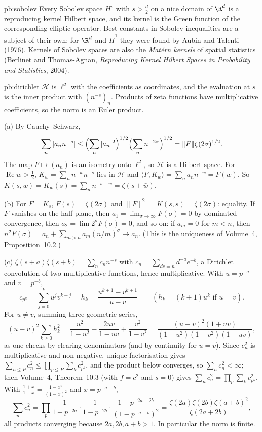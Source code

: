 \begin{solution}{pb:sobolev}
\leads Every Sobolev space $H^s$ with $s>\frac d2$ on a nice domain of $\R^d$ is a reproducing kernel Hilbert space, and its kernel is the Green function of the corresponding elliptic
operator. Best constants in Sobolev inequalities are a subject of their own; for $\R^d$ and $\dot H^1$ they were found by Aubin and Talenti (1976). Kernels of Sobolev spaces are also the
\emph{Matérn kernels} of spatial statistics (Berlinet and Thomas-Agnan, \emph{Reproducing Kernel Hilbert Spaces in Probability and Statistics}, 2004).
\end{solution}

\begin{solution}{pb:dirichlet}
\idea $\mathcal H$ is $\ell^2$ with the coefficients as coordinates, and the evaluation at $s$ is the inner product with $(n^{-\bar s})_n$. Products of zeta functions have
multiplicative coefficients, so the norm is an Euler product.

\writeup (a) By Cauchy--Schwarz,
\[
\sum_n|a_nn^{-s}|\le\Bigl(\sum_n|a_n|^2\Bigr)^{1/2}\Bigl(\sum_nn^{-2\sigma}\Bigr)^{1/2}=\|F\|\zeta(2\sigma)^{1/2}.
\] The map $F\mapsto(a_n)$ is an isometry onto
$\ell^2$, so $\mathcal H$ is a Hilbert space. For $\operatorname{Re}w>\frac12$, $K_w=\sum_nn^{-\bar w}n^{-s}$ lies in $\mathcal H$ and $\langle F,K_w\rangle=\sum_na_nn^{-w}=F(w)$. So
$K(s,w)=K_w(s)=\sum_nn^{-s-\bar w}=\zeta(s+\bar w)$.

(b) For $F=K_s$, $F(s)=\zeta(2\sigma)$ and $\|F\|^2=K(s,s)=\zeta(2\sigma)$: equality. If $F$ vanishes on the half-plane, then $a_1=\lim_{\sigma\to\infty}F(\sigma)=0$ by dominated
convergence, then $a_2=\lim2^\sigma F(\sigma)=0$, and so on: if $a_m=0$ for $m<n$, then $n^\sigma F(\sigma)=a_n+\sum_{m>n}a_m(n/m)^\sigma\to a_n$. (This is the uniqueness of Volume~4,
Proposition~10.2.)

(c) $\zeta(s+a)\zeta(s+b)=\sum_nc_nn^{-s}$ with $c_n=\sum_{de=n}d^{-a}e^{-b}$, a Dirichlet convolution of two multiplicative functions, hence multiplicative. With $u=p^{-a}$ and $v=p^{-b}$,
\[
c_{p^k}=\sum_{j=0}^ku^jv^{k-j}=h_k=\frac{u^{k+1}-v^{k+1}}{u-v}\qquad(h_k=(k+1)u^k\text{ if }u=v).
\]
For $u\ne v$, summing three geometric series,
\[
(u-v)^2\sum_{k\ge0}h_k^2=\frac{u^2}{1-u^2}-\frac{2uv}{1-uv}+\frac{v^2}{1-v^2}=\frac{(u-v)^2(1+uv)}{(1-u^2)(1-v^2)(1-uv)},
\]
as one checks by clearing denominators (and by continuity for $u=v$). Since $c_n^2$ is multiplicative and non-negative, unique factorisation gives $\sum_{n\le P}c_n^2\le\prod_{p\le P}\sum_kc_{p^k}^2$, and the product below
converges, so $\sum_nc_n^2<\infty$; then Volume~4, Theorem~10.3 (with $f=c^2$ and $s=0$) gives $\sum_nc_n^2=\prod_p\sum_kc_{p^k}^2$. With $\frac{1+x}{1-x}=\frac{1-x^2}{(1-x)^2}$ and $x=p^{-a-b}$,
\[
\sum_nc_n^2=\prod_p\frac1{1-p^{-2a}}\cdot\frac1{1-p^{-2b}}\cdot\frac{1-p^{-2a-2b}}{(1-p^{-a-b})^2}=\frac{\zeta(2a)\zeta(2b)\zeta(a+b)^2}{\zeta(2a+2b)},
\]
all products converging because $2a,2b,a+b>1$. In particular the norm is finite.


\end{solution}
